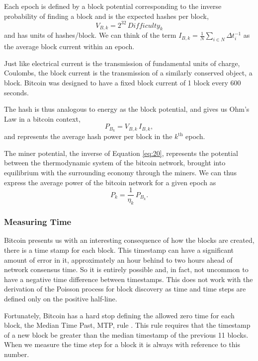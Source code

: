 \documentclass[runningheads]{llncs}
\begin{document}
Each epoch is defined by a block potential corresponding to the inverse probability of finding a block and is the expected hashes per block,
\begin{equation}
    V_{B,k} = 2^{32}\,Difficulty_k
\end{equation}
and has units of hashes/block.
We can think of the term $I_{B,k}=\frac{1}{N} \sum_{i\in N} \Delta t_i^{-1}$ as the average block current within an epoch.

Just like electrical current is the transmission of fundamental units of charge, Coulombs, the block current is the transmission of a similarly conserved object, a block.
Bitcoin was designed to have a fixed block current of 1 block every $600$ seconds.

The hash is thus analogous to energy as the block potential, and gives us Ohm's Law in a bitcoin context,
\begin{equation}
    P_{B_k} = V_{B,k}\,I_{B,k},
\end{equation}
and represents the average hash power per block in the $k^{\mathrm{th}}$ epoch.

The miner potential, the inverse of Equation \ref{eq:20}, represents the potential between the thermodynamic system of the bitcoin network, brought into equilibrium with the surrounding economy through the miners.
We can thus express the average power of the bitcoin network for a given epoch as
\begin{equation}
    P_k = \frac{1}{\eta_k}\,P_{B_k}.
\end{equation}
\subsubsection{Measuring Time}
Bitcoin presents us with an interesting consequence of how the blocks are created, there is a time stamp for each block.
This timestamp can have a significant amount of error in it, approximately an hour behind to two hours ahead of network consensus time.
So it is entirely possible and, in fact, not uncommon to have a negative time difference between timestamps.
This does not work with the derivation of the Poisson process for block discovery as time and time steps are defined only on the positive half-line.

Fortunately, Bitcoin has a hard stop defining the allowed zero time for each block, the Median Time Past, MTP, rule \cite{bitcoin2021core}.
This rule requires that the timestamp of a new block be greater than the median timestamp of the previous 11 blocks.
When we measure the time step for a block it is always with reference to this number.
\end{document}
